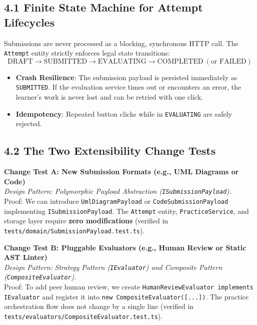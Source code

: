 \documentclass[10pt,a4paper]{article}
\begin{document}
\subsection{4.1 Finite State Machine for Attempt Lifecycles}
Submissions are never processed as a blocking, synchronous HTTP call. The \texttt{Attempt} entity strictly enforces legal state transitions:
$$\text{DRAFT} \longrightarrow \text{SUBMITTED} \longrightarrow \text{EVALUATING} \longrightarrow \text{COMPLETED} \ (\text{or } \text{FAILED})$$
\begin{itemize}
  \item \textbf{Crash Resilience}: The submission payload is persisted immediately as \texttt{SUBMITTED}. If the evaluation service times out or encounters an error, the learner's work is never lost and can be retried with one click.
  \item \textbf{Idempotency}: Repeated button clicks while in \texttt{EVALUATING} are safely rejected.
\end{itemize}

\subsection{4.2 The Two Extensibility Change Tests}
\textbf{Change Test A: New Submission Formats (e.g., UML Diagrams or Code)} \\
\textit{Design Pattern: Polymorphic Payload Abstraction (\texttt{ISubmissionPayload}).} \\
Proof: We can introduce \texttt{UmlDiagramPayload} or \texttt{CodeSubmissionPayload} implementing \texttt{ISubmissionPayload}. The \texttt{Attempt} entity, \texttt{PracticeService}, and storage layer require \textbf{zero modifications} (verified in \texttt{tests/domain/SubmissionPayload.test.ts}).

\textbf{Change Test B: Pluggable Evaluators (e.g., Human Review or Static AST Linter)} \\
\textit{Design Pattern: Strategy Pattern (\texttt{IEvaluator}) and Composite Pattern (\texttt{CompositeEvaluator}).} \\
Proof: To add peer human review, we create \texttt{HumanReviewEvaluator implements IEvaluator} and register it into \texttt{new CompositeEvaluator([...])}. The practice orchestration flow does not change by a single line (verified in \texttt{tests/evaluators/CompositeEvaluator.test.ts}).
\end{document}
